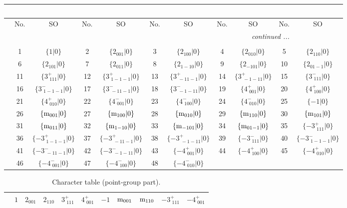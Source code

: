 \documentclass[fleqn,10pt,landscape]{article}
\begin{document}
\begin{itemize}
\begin{center}
\begin{longtable}{c|cc|cc|cc|cc|cc}
\multicolumn{10}{l}{\tablename\ \thetable{}} \\
 \hline \hline
 & No. & SO & No. & SO & No. & SO & No. & SO & No. & SO \\ \hline \endhead

 \hline \hline
\multicolumn{10}{r}{\footnotesize\it continued ...} \\ \endfoot

 \hline \hline
\multicolumn{10}{r}{} \\ \endlastfoot

 & 1 & $\{1|0\}$ & 2 & $\{2{}_{001}|0\}$ & 3 & $\{2{}_{100}|0\}$ & 4 & $\{2{}_{010}|0\}$ & 5 & $\{2{}_{110}|0\}$ \\
& 6 & $\{2{}_{101}|0\}$ & 7 & $\{2{}_{011}|0\}$ & 8 & $\{2{}_{1-10}|0\}$ & 9 & $\{2{}_{-101}|0\}$ & 10 & $\{2{}_{01-1}|0\}$ \\
& 11 & $\{3^{+}_{\,\,111}|0\}$ & 12 & $\{3^{+}_{\,\,1-1-1}|0\}$ & 13 & $\{3^{+}_{\,\,-11-1}|0\}$ & 14 & $\{3^{+}_{\,\,-1-11}|0\}$ & 15 & $\{3^{-}_{\,\,111}|0\}$ \\
& 16 & $\{3^{-}_{\,\,1-1-1}|0\}$ & 17 & $\{3^{-}_{\,\,-11-1}|0\}$ & 18 & $\{3^{-}_{\,\,-1-11}|0\}$ & 19 & $\{4^{+}_{\,\,001}|0\}$ & 20 & $\{4^{+}_{\,\,100}|0\}$ \\
& 21 & $\{4^{+}_{\,\,010}|0\}$ & 22 & $\{4^{-}_{\,\,001}|0\}$ & 23 & $\{4^{-}_{\,\,100}|0\}$ & 24 & $\{4^{-}_{\,\,010}|0\}$ & 25 & $\{-1|0\}$ \\
& 26 & $\{{\rm m}_{001}|0\}$ & 27 & $\{{\rm m}_{100}|0\}$ & 28 & $\{{\rm m}_{010}|0\}$ & 29 & $\{{\rm m}_{110}|0\}$ & 30 & $\{{\rm m}_{101}|0\}$ \\
& 31 & $\{{\rm m}_{011}|0\}$ & 32 & $\{{\rm m}_{1-10}|0\}$ & 33 & $\{{\rm m}_{-101}|0\}$ & 34 & $\{{\rm m}_{01-1}|0\}$ & 35 & $\{-3^{+}_{\,\,111}|0\}$ \\
& 36 & $\{-3^{+}_{\,\,1-1-1}|0\}$ & 37 & $\{-3^{+}_{\,\,-11-1}|0\}$ & 38 & $\{-3^{+}_{\,\,-1-11}|0\}$ & 39 & $\{-3^{-}_{\,\,111}|0\}$ & 40 & $\{-3^{-}_{\,\,1-1-1}|0\}$ \\
& 41 & $\{-3^{-}_{\,\,-11-1}|0\}$ & 42 & $\{-3^{-}_{\,\,-1-11}|0\}$ & 43 & $\{-4^{+}_{\,\,001}|0\}$ & 44 & $\{-4^{+}_{\,\,100}|0\}$ & 45 & $\{-4^{+}_{\,\,010}|0\}$ \\
& 46 & $\{-4^{-}_{\,\,001}|0\}$ & 47 & $\{-4^{-}_{\,\,100}|0\}$ & 48 & $\{-4^{-}_{\,\,010}|0\}$ &  &  &  &  \\
\end{longtable}
\end{center}
\begin{center}
\renewcommand{\arraystretch}{1.0}
\begin{longtable}{c|rrrrrrrrrr}
\caption{Character table (point-group part).}
 \\
 \hline \hline
 & $ 1 $ & $ 2{}_{001} $ & $ 2{}_{110} $ & $ 3^{+}_{\,\,111} $ & $ 4^{+}_{\,\,001} $ & $ -1 $ & $ {\rm m}_{001} $ & $ {\rm m}_{110} $ & $ -3^{+}_{\,\,111} $ & $ -4^{+}_{\,\,001} $ \\ \hline \endfirsthead


\end{longtable}
\end{center}
\end{itemize}
\end{document}
